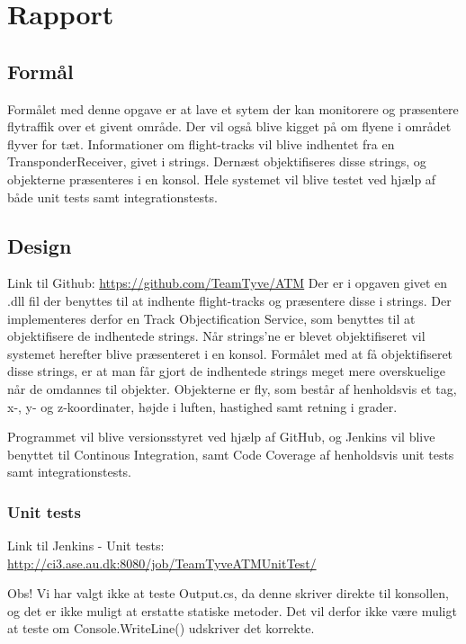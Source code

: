 \chapter{Rapport}
\section{Formål}
Formålet med denne opgave er at lave et sytem der kan monitorere og præsentere flytraffik over et givent område. Der vil også blive kigget på om flyene i området flyver for tæt. Informationer om flight-tracks vil blive indhentet fra en TransponderReceiver, givet i strings. Dernæst objektifiseres disse strings, og objekterne præsenteres i en konsol. 
Hele systemet vil blive testet ved hjælp af både unit tests samt integrationstests.


\section{Design}
Link til Github: \url{https://github.com/TeamTyve/ATM} \newline \newline 
Der er i opgaven givet en .dll fil der benyttes til at indhente flight-tracks og præsentere disse i strings. Der implementeres derfor en Track Objectification Service, som benyttes til at objektifisere de indhentede strings. \tabularnewline
Når strings'ne er blevet objektifiseret vil systemet herefter blive præsenteret i en konsol. \newline
Formålet med at få objektifiseret disse strings, er at man får gjort de indhentede strings meget mere overskuelige når de omdannes til objekter. \newline
Objekterne er fly, som består af henholdsvis et tag, x-, y- og z-koordinater, højde i luften, hastighed samt retning i grader. 


Programmet vil blive versionsstyret ved hjælp af GitHub, og Jenkins vil blive benyttet til Continous Integration, samt Code Coverage af henholdsvis unit tests samt integrationstests.

\subsection{Unit tests}
Link til Jenkins - Unit tests: \url{http://ci3.ase.au.dk:8080/job/TeamTyveATMUnitTest/} \newline \newline

Obs! Vi har valgt ikke at teste Output.cs, da denne skriver direkte til konsollen, og det er ikke muligt at erstatte statiske metoder. Det vil derfor ikke være muligt at teste om Console.WriteLine() udskriver det korrekte. 

